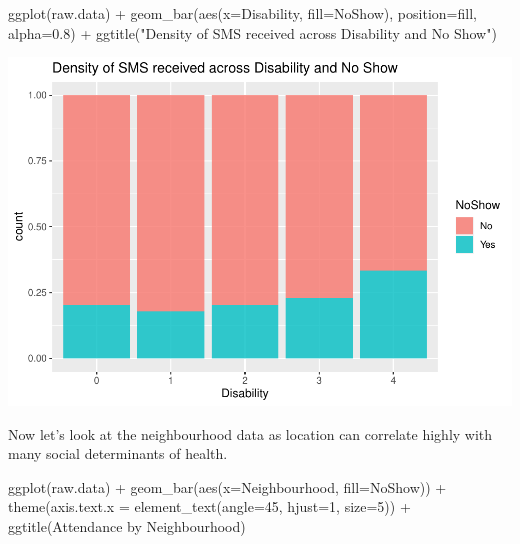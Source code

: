 \documentclass[
]{article}
\newenvironment{Shaded}{\begin{snugshade}}{\end{snugshade}}
\newcommand{\AttributeTok}[1]{\textcolor[rgb]{0.77,0.63,0.00}{#1}}
\newcommand{\DecValTok}[1]{\textcolor[rgb]{0.00,0.00,0.81}{#1}}
\newcommand{\FloatTok}[1]{\textcolor[rgb]{0.00,0.00,0.81}{#1}}
\newcommand{\FunctionTok}[1]{\textcolor[rgb]{0.00,0.00,0.00}{#1}}
\newcommand{\NormalTok}[1]{#1}
\newcommand{\SpecialCharTok}[1]{\textcolor[rgb]{0.00,0.00,0.00}{#1}}
\newcommand{\StringTok}[1]{\textcolor[rgb]{0.31,0.60,0.02}{#1}}
\begin{document}
\begin{Shaded}
\begin{Highlighting}[]
\FunctionTok{ggplot}\NormalTok{(raw.data) }\SpecialCharTok{+} 
  \FunctionTok{geom\_bar}\NormalTok{(}\FunctionTok{aes}\NormalTok{(}\AttributeTok{x=}\NormalTok{Disability, }\AttributeTok{fill=}\NormalTok{NoShow), }\AttributeTok{position=}\StringTok{\textquotesingle{}fill\textquotesingle{}}\NormalTok{, }\AttributeTok{alpha=}\FloatTok{0.8}\NormalTok{) }\SpecialCharTok{+} 
  \FunctionTok{ggtitle}\NormalTok{(}\StringTok{"Density of SMS received across Disability and No Show"}\NormalTok{)}
\end{Highlighting}
\end{Shaded}

\begin{center}\includegraphics{lab1_medical_databases_files/figure-latex/unnamed-chunk-10-2} \end{center}

Now let's look at the neighbourhood data as location can correlate
highly with many social determinants of health.

\begin{Shaded}
\begin{Highlighting}[]
\FunctionTok{ggplot}\NormalTok{(raw.data) }\SpecialCharTok{+} 
  \FunctionTok{geom\_bar}\NormalTok{(}\FunctionTok{aes}\NormalTok{(}\AttributeTok{x=}\NormalTok{Neighbourhood, }\AttributeTok{fill=}\NormalTok{NoShow)) }\SpecialCharTok{+} 
  \FunctionTok{theme}\NormalTok{(}\AttributeTok{axis.text.x =} \FunctionTok{element\_text}\NormalTok{(}\AttributeTok{angle=}\DecValTok{45}\NormalTok{, }\AttributeTok{hjust=}\DecValTok{1}\NormalTok{, }\AttributeTok{size=}\DecValTok{5}\NormalTok{)) }\SpecialCharTok{+} 
  \FunctionTok{ggtitle}\NormalTok{(}\StringTok{\textquotesingle{}Attendance by Neighbourhood\textquotesingle{}}\NormalTok{)}
\end{Highlighting}
\end{Shaded}
\end{document}
